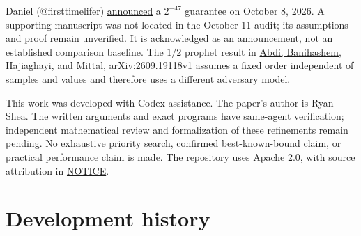 \documentclass[11pt]{article}
\begin{document}
Daniel (@firsttimelifer) \href{https://x.com/firsttimelifer/status/2108282829809541468}{announced} a \(2^{-47}\) guarantee on October 8, 2026. A supporting manuscript was not located in the October 11 audit; its assumptions and proof remain unverified. It is acknowledged as an announcement, not an established comparison baseline. The \(1/2\) prophet result in \href{https://arxiv.org/abs/2609.19118v1}{Abdi, Banihashem, Hajiaghayi, and Mittal, arXiv:2609.19118v1} assumes a fixed order independent of samples and values and therefore uses a different adversary model.

This work was developed with Codex assistance. The paper's author is Ryan Shea. The written arguments and exact programs have same-agent verification; independent mathematical review and formalization of these refinements remain pending. No exhaustive priority search, confirmed best-known-bound claim, or practical performance claim is made. The repository uses Apache 2.0, with source attribution in \href{https://github.com/shea256/matroid-prophet-inequality/blob/master/NOTICE}{NOTICE}.

\section{Development history}\label{development-history}
\end{document}
